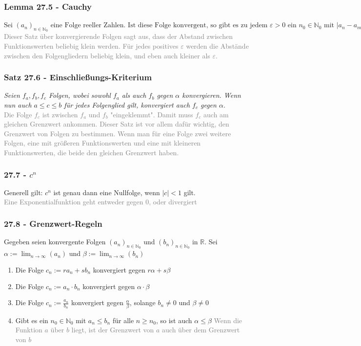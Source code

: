 \documentclass{report}
\begin{document}
			\subsubsection{Lemma 27.5 - Cauchy}
				\textit{$
					\mbox{Sei } (a_n)_{n\in\mathbb{N}_0} \mbox{ eine Folge reeller Zahlen. Ist diese Folge konvergent,  so gibt es zu jedem } \varepsilon > 0 \mbox{ ein } n_0 \in \mathbb{N}_0 \mbox{ mit } |a_n - a_m| < \varepsilon \mbox{ für alle } n \geq m \neq n_0
				$}\\
				\textcolor{gray}{Dieser Satz über konvergierende Folgen sagt aus, dass der Abstand zwischen Funktionswerten beliebig klein werden. Für jedes positives $\varepsilon$ werden die Abstände zwischen den Folgengliedern beliebig klein, und eben auch kleiner als $\varepsilon$.}
			\subsubsection{Satz 27.6 - Einschließungs-Kriterium}
				\textit{Seien $f_a, f_b, f_c$ Folgen, wobei sowohl $f_a$ als auch $f_b$ gegen $\alpha$ konvergieren. Wenn nun auch $a \leq c \leq b$ für jedes Folgenglied gilt, konvergiert auch $f_c$ gegen $\alpha$}.\\
				\textcolor{gray}{Die Folge $f_c$ ist zwischen $f_a$ und $f_b$ "eingeklemmt". Damit muss $f_c$ auch am gleichen Grenzwert ankommen. Dieser Satz ist vor allem dafür wichtig, den Grenzwert von Folgen zu bestimmen. Wenn man für eine Folge zwei weitere Folgen, eine mit größeren Funktionswerten und eine mit kleineren Funktionswerten, die beide den gleichen Grenzwert haben.}
			\subsubsection{27.7 - $c^n$}
				Generell gilt: $c^n$ ist genau dann eine Nullfolge, wenn $|c| < 1$ gilt. \\
				\textcolor{gray}{Eine Exponentialfunktion geht entweder gegen 0, oder divergiert}
			\subsubsection{27.8 - Grenzwert-Regeln}
				Gegeben seien konvergente Folgen $(a_n)_{n\in\mathbb{N}_0}$ und $(b_n)_{n\in\mathbb{N}_0}$ in $\mathbb{R}$. Sei $\alpha := \displaystyle\lim_{n\to\infty}(a_n)$ und $\beta:= \displaystyle\lim_{n\to\infty}(b_n)$
				\begin{enumerate}[label=(\alph*)]
					\item Die Folge $c_n := ra_n + sb_n$ konvergiert gegen $r\alpha+s\beta$
					\item Die Folge $c_n := a_n \cdot b_n$ konvergiert gegen $\alpha \cdot \beta$
					\item Die Folge $c_n := \frac{a_n}{b_n}$ konvergiert gegen $\frac{\alpha}{\beta}$, solange $b_n \neq 0$ und $\beta \neq 0$
					\item Gibt es ein $n_0 \in \mathbb{N}_0$ mit $a_n \leq b_n$ für alle $n \geq n_0$, so ist auch $\alpha \leq \beta$
					\textcolor{gray}{Wenn die Funktion $a$ über $b$ liegt, ist der Grenzwert von $a$ auch über dem Grenzwert von $b$}
				\end{enumerate}
\end{document}
